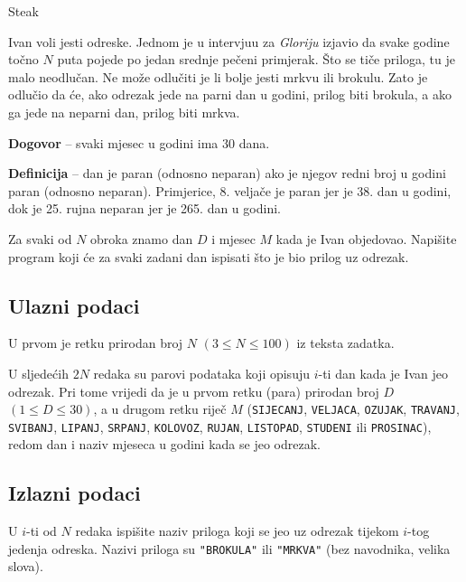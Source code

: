 \begin{statement}[
  problempoints=20,
  timelimit=1 sekunda,
  memorylimit=512 MiB,
]{Steak}


Ivan voli jesti odreske. Jednom je u intervjuu za \textit{Gloriju} izjavio da svake
godine točno $N$ puta pojede po jedan srednje pečeni primjerak. Što se tiče
priloga, tu je malo neodlučan. Ne može odlučiti je li bolje jesti mrkvu ili
brokulu. Zato je odlučio da će, ako odrezak jede na parni dan u godini,
prilog biti brokula, a ako ga jede na neparni dan, prilog biti mrkva.

\textbf{Dogovor} -- svaki mjesec u godini ima $30$ dana.

\textbf{Definicija} -- dan je paran (odnosno neparan) ako je njegov redni broj
u godini paran (odnosno neparan). Primjerice, 8. veljače je paran jer je 38.
dan u godini, dok je 25.  rujna neparan jer je 265. dan u godini.

Za svaki od $N$ obroka znamo dan $D$ i mjesec $M$ kada je Ivan objedovao.
Napišite program koji će za svaki zadani dan ispisati što je bio prilog uz
odrezak.

\subsection*{Ulazni podaci}
U prvom je retku prirodan broj $N$ $(3 \le N \le 100)$ iz teksta zadatka.

U sljedećih $2N$ redaka su parovi podataka koji opisuju $i$-ti dan kada je Ivan
jeo odrezak. Pri tome vrijedi da je u prvom retku (para) prirodan broj $D$
$(1 \le D \le 30)$, a u drugom retku riječ $M$ (\texttt{SIJECANJ},
\texttt{VELJACA}, \texttt{OZUJAK}, \texttt{TRAVANJ}, \texttt{SVIBANJ},
\texttt{LIPANJ}, \texttt{SRPANJ}, \texttt{KOLOVOZ}, \texttt{RUJAN},
\texttt{LISTOPAD}, \texttt{STUDENI} ili \texttt{PROSINAC}), redom dan i naziv
mjeseca u godini kada se jeo odrezak.

\subsection*{Izlazni podaci}
U $i$-ti od $N$ redaka ispišite naziv priloga koji se jeo uz odrezak tijekom
$i$-tog jedenja odreska. Nazivi priloga su \texttt{"BROKULA"} ili
\texttt{"MRKVA"} (bez navodnika, velika slova).



\end{statement}
